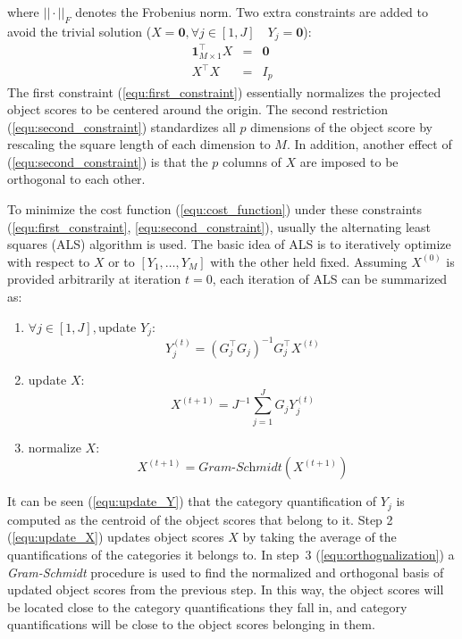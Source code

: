 \documentclass[a4paper]{article}
\begin{document}
where $||\cdot||_F$ denotes the Frobenius norm. Two extra constraints are added to avoid the trivial solution ($X=\mathbf{0}, \forall j\in [1,J]\quad Y_j=\mathbf{0}$):
\begin{eqnarray}
  \mathbf{1}_{M\times 1}^\top X&=&\mathbf{0}
  \label{equ:first_constraint} \\
  X^\top X&=&I_p
  \label{equ:second_constraint}
\end{eqnarray}
The first constraint (\ref{equ:first_constraint}) essentially normalizes the projected object scores to be centered around the origin.  
The second restriction (\ref{equ:second_constraint}) standardizes all $p$ dimensions of the object score by rescaling the square length of 
each dimension to $M$. In addition, another effect of (\ref{equ:second_constraint}) is that the $p$ columns of $X$ are imposed to be 
orthogonal to each other.   

To minimize the cost function (\ref{equ:cost_function}) under these constraints (\ref{equ:first_constraint}, \ref{equ:second_constraint}), usually 
the alternating least squares (ALS) algorithm \citep{gifi} is used. The basic idea of ALS is to iteratively optimize with respect to $X$ or 
to $[Y_1,\ldots,Y_M]$ with the other held fixed. Assuming $X^{(0)}$ is provided arbitrarily at iteration $t=0$, each iteration of ALS can be summarized as:    
\begin{enumerate}
    \item $\forall j\in[1,J],  $update $Y_j$: 
  \begin{equation}
    Y_j^{(t)}=(G_j^\top G_j)^{-1}G_j^{\top}X^{(t)}
    \label{equ:update_Y}
  \end{equation}
  \item update $X$:
    \begin{equation}
        X^{(t+1)}=J^{-1}\sum_{j=1}^{J}G_j Y_j^{(t)}
      \label{equ:update_X}
    \end{equation}
  \item normalize $X$: 
    \begin{equation}
    X^{(t+1)}=\textit{Gram-Schmidt}(X^{(t+1)})
    \label{equ:orthognalization}
  \end{equation}
\end{enumerate}
It can be seen (\ref{equ:update_Y}) that the category quantification of $Y_j$ is computed as the centroid of the object scores that belong to it. 
Step 2 (\ref{equ:update_X}) updates object scores $X$ 
by taking the average of the quantifications of the categories it belongs to. In step~3 (\ref{equ:orthognalization}) a \emph{Gram-Schmidt} procedure is used to find 
the normalized and orthogonal basis of updated object scores from the previous step. In this way, the object scores will be located close to the category 
quantifications they fall in, and category quantifications will be close to the object scores belonging in them.   
\end{document}
